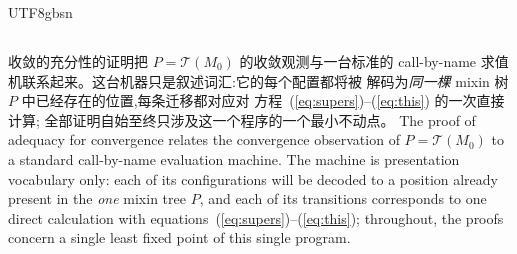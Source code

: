 \begin{CJK*}{UTF8}{gbsn}


\subsection{}

\ifPaperChinese
收敛的充分性的证明把 $P = \mathcal{T}(M_0)$ 的收敛观测与一台标准的
call-by-name 求值机联系起来。这台机器只是叙述词汇:它的每个配置都将被
解码为\emph{同一棵} mixin 树 $P$ 中已经存在的位置,每条迁移都对应对
方程~(\ref{eq:supers})--(\ref{eq:this}) 的一次直接计算;
全部证明自始至终只涉及这一个程序的一个最小不动点。
\else
The proof of adequacy for convergence relates the convergence observation of
$P = \mathcal{T}(M_0)$ to a standard call-by-name evaluation machine.
The machine is presentation vocabulary only: each of its
configurations will be decoded to a position already present in the
\emph{one} mixin tree $P$, and each of its transitions corresponds to
one direct calculation with
equations~(\ref{eq:supers})--(\ref{eq:this}); throughout, the proofs
concern a single least fixed point of this single program.
\fi


\end{CJK*}
